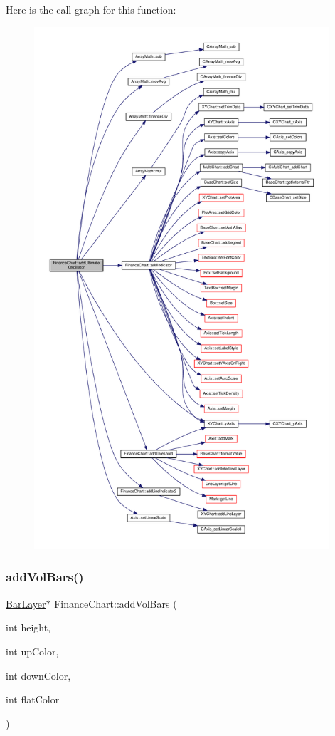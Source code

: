 Here is the call graph for this function\+:
\nopagebreak
\begin{figure}[H]
\begin{center}
\leavevmode
\includegraphics[height=550pt]{class_finance_chart_aa7a2bc1fab9c1ec538ff293c107d6cc4_cgraph}
\end{center}
\end{figure}
\mbox{\label{class_finance_chart_aa1405175c2d8761adcf41c5529ef4613}} 
\subsubsection{\texorpdfstring{add\+Vol\+Bars()}{addVolBars()}}
{\footnotesize\ttfamily \hyperlink{class_bar_layer}{Bar\+Layer}$\ast$ Finance\+Chart\+::add\+Vol\+Bars (\begin{DoxyParamCaption}\item[{int}]{height,  }\item[{int}]{up\+Color,  }\item[{int}]{down\+Color,  }\item[{int}]{flat\+Color }\end{DoxyParamCaption})\hspace{0.3cm}{\ttfamily [inline]}}



